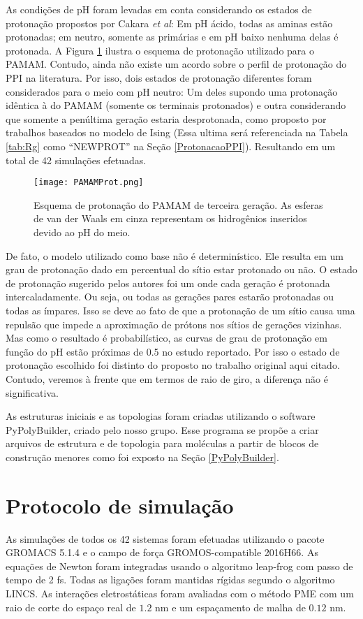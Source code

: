 As condições de pH foram levadas em conta considerando os estados de protonação propostos por Cakara \textit{et al}\cite{Cakara2003}: Em pH ácido, todas as aminas estão protonadas; em neutro, somente as primárias e em pH baixo nenhuma delas é protonada. 
A Figura \ref{PAMAMProt} ilustra o esquema de protonação utilizado para o PAMAM.
Contudo, ainda não existe um acordo sobre o perfil de protonação do PPI na literatura. 
Por isso, dois estados de protonação diferentes foram considerados para o meio com pH neutro: Um deles supondo uma protonação idêntica à do PAMAM (somente os terminais protonados) e outra considerando que somente a penúltima geração estaria desprotonada, como proposto por trabalhos baseados no modelo de Ising\cite{VanDuijvenbode1998, Koper1997} (Essa ultima será referenciada na Tabela \ref{tab:Rg} como ``NEWPROT'' na Seção \ref{ProtonacaoPPI}).
Resultando em um total de 42 simulações efetuadas.

\begin{figure}[ht]
\centering
\texttt{[image: PAMAMProt.png]}
\caption{Esquema de protonação do PAMAM de terceira geração. As esferas de van der Waals em cinza representam os hidrogênios inseridos devido ao pH do meio.}
\label{PAMAMProt}
\end{figure}

De fato, o modelo utilizado como base não é determinístico. 
Ele resulta em um grau de protonação dado em percentual do sítio estar protonado ou não.
O estado de protonação sugerido pelos autores\cite{VanDuijvenbode1998, Koper1997} foi um onde cada geração é protonada intercaladamente.
Ou seja, ou todas as gerações pares estarão protonadas ou todas as ímpares.
Isso se deve ao fato de que a protonação de um sítio causa uma repulsão que impede a aproximação de prótons nos sítios de gerações vizinhas.
Mas como o resultado é probabilístico, as curvas de grau de protonação em função do pH estão próximas de 0.5 no estudo reportado\cite{VanDuijvenbode1998, Koper1997}.
Por isso o estado de protonação escolhido foi distinto do proposto no trabalho original aqui citado.
Contudo, veremos à frente que em termos de raio de giro, a diferença não é significativa.

As estruturas iniciais e as topologias foram criadas utilizando o software PyPolyBuilder, criado pelo nosso grupo.
Esse programa se propõe a criar arquivos de estrutura e de topologia para moléculas a partir de blocos de construção menores como foi exposto na Seção \ref{PyPolyBuilder}.


\section{Protocolo de simulação}\label{ProtocoloDeSimulacao}
As simulações de todos os 42 sistemas foram efetuadas utilizando o pacote GROMACS 5.1.4\cite{VanDerSpoel2005} e o campo de força GROMOS-compatible 2016H66\cite{Horta2016}.
As equações de Newton foram integradas usando o algoritmo leap-frog com passo de tempo de 2 fs.
Todas as ligações foram mantidas rígidas segundo o algoritmo LINCS\cite{Hess1997}.
As interações eletrostáticas foram avaliadas com o método PME\cite{Essmann1995} com um raio de corte do espaço real de $1.2$ nm e um espaçamento de malha de $0.12$ nm.

